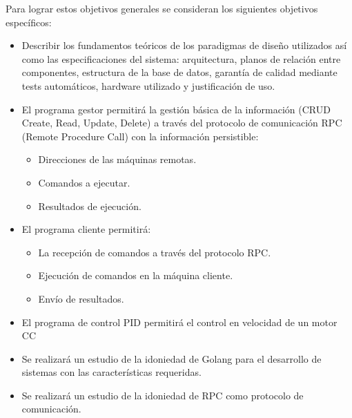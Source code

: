 Para lograr estos objetivos generales se consideran los siguientes objetivos específicos:
\begin{itemize}
    \item Describir los fundamentos teóricos de los paradigmas de diseño utilizados así como las especificaciones del sistema: arquitectura, planos de relación entre componentes, estructura de la base de datos, garantía de calidad mediante tests automáticos, hardware utilizado y justificación de uso.
    \item El programa gestor permitirá la gestión básica de la información (\gls{CRUD} Create, Read, Update, Delete) a través del protocolo de comunicación \gls{RPC} (Remote Procedure Call) con la información persistible:
    \begin{itemize}
        \item Direcciones de las máquinas remotas.
        \item Comandos a ejecutar.
        \item Resultados de ejecución.
    \end{itemize}
    \item El programa cliente permitirá:
    \begin{itemize}
        \item La recepción de comandos a través del protocolo RPC.
        \item Ejecución de comandos en la máquina cliente.
        \item Envío de resultados.
    \end{itemize}
    \item El programa de control PID permitirá el control en velocidad de un motor CC
    \item Se realizará un estudio de la idoniedad de Golang para el desarrollo de sistemas con las características requeridas.
    \item Se realizará un estudio de la idoniedad de RPC como protocolo de comunicación.
\end{itemize}
